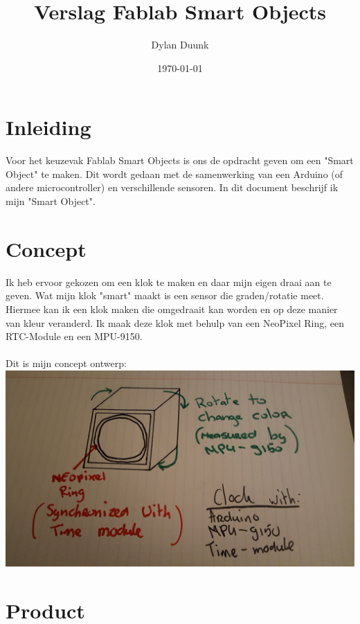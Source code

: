\documentclass[a4paper,12pt]{article}
\begin{document}
\lstset{language=C++}
\title{Verslag Fablab Smart Objects}
\author{Dylan Duunk}
\date{\today}
\maketitle

\newpage
\tableofcontents
\newpage
{}

\section{Inleiding}
Voor het keuzevak Fablab Smart Objects is ons de opdracht geven om een
"Smart Object" te maken. Dit wordt gedaan met de samenwerking van  een Arduino (of andere microcontroller)
en verschillende sensoren. In dit document beschrijf ik mijn "Smart Object".

\section{Concept}
Ik heb ervoor gekozen om een klok te maken en daar mijn eigen draai aan te geven.
Wat mijn klok "smart" maakt is een sensor die graden/rotatie meet. Hiermee kan ik
een klok maken die omgedraait kan worden en op deze manier van kleur veranderd. 
Ik maak deze klok met behulp van een NeoPixel Ring, een RTC-Module en een MPU-9150. 
\\ \\
Dit is mijn concept ontwerp:
\newline
\includegraphics[scale=0.13, angle=180]{concept}
\newpage

\section{Product}
\end{document}

